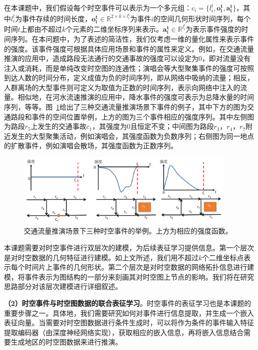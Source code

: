 \documentclass[12pt,UTF8,AutoFakeBold=2,a4paper]{ctexart} %
\begin{document}
在本课题中，我们假设每个时空事件可以表示为一个多元组：$c_i = \{l^t_i, \mathbf{o^t_i}, \mathbf{a^t_i}\}$，其中$l^t_i$为事件存续的时间长度，$\mathbf{o^t_i}\in\mathbb{R}^{2\times k\times l^t_i}$为事件$i$的空间几何形状时间序列，每个时间$t$上都由不超过$k$个元素的二维坐标序列来表示。$\mathbf{a_i^t} \in \mathbb{R}^{l^t_i}$为表示事件强度的时间序列。在本问题中，为了表述的简洁性，我们仅考虑一维的量化属性来表示事件的强度。该事件强度可根据具体应用场景和事件的属性来定义。例如，在交通流量推演的应用中，造成路段无法通行的交通事故的强度可以设定为0，即对流量没有注入或消耗，而是单纯改变时空图的连通性；演唱会等大型聚集事件的强度可按照到达人数的时间分布，定义成值为负的时间序列，即从网络中吸纳的流量；相反，人群离场的大型事件则可定义为取值为正数的时间序列，表示向网络中注入的流量。相似地，在河水流速推演的应用中，降水事件的强度可表示为总降水量的时间序列，等等。图~\ref{fig:event1}给出了三种交通流量推演场景下事件的例子，其中下方的图为交通路段和事件的空间位置举例，上方的图为三个事件相应的强度序列。其中左侧图为路段$r_5$上发生的交通事故$c_1$，其强度为0且恒定不变；中间图为路段$r_3$，$r_4$，$r_7$附近发生的大型聚集活动，例如演唱会，其强度函数为负数序列；右侧图为同一地点的扩散事件，例如演唱会散场，其强度函数为正数序列。

\begin{figure}
\centering
\includegraphics[width=0.95\textwidth]{fig/event-1.png}    
\caption{{\kaishu 交通流量推演场景下三种时空事件的举例。上方为相应的强度函数。}}
\label{fig:event1}
\end{figure}

本课题需要对时空事件进行双层次的建模，为后续表征学习提供信息。第一个层次是对时空数据的几何特征进行建模。如上文所述，我们用不超过$k$个二维坐标点表示每个时间片上事件的几何形状。第二个层次是对时空数据的网络拓扑信息进行建模，将事件表示为图结构的一部分来刻画其对时空图上节点的影响。我们将在研究思路部分对该层次建模进行详细叙述。%

\textbf{（2）时空事件与时空图数据的联合表征学习}。时空事件的表征学习也是本课题的重要步骤之一。具体地，我们需要研究如何对事件进行信息提取，并生成一个嵌入表征向量。当需要对时空图数据进行条件生成时，可以将作为条件的事件输入特征提取编码器（由深度神经网络实现），获取相应的嵌入信息，再将嵌入信息结合需要生成地区的时空图数据来进行推演。
\end{document}
